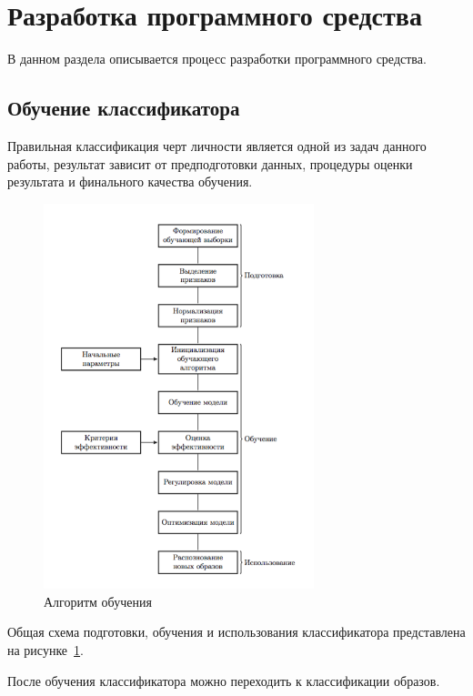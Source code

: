 \section{Разработка программного средства}
В данном раздела описывается процесс разработки программного \mbox{средства.}

\subsection{Обучение классификатора}
Правильная классификация черт личности является одной из задач данного работы, результат зависит от предподготовки данных, процедуры оценки результата и финального качества обучения.

\begin{figure}[h]
    \centering
    \includegraphics[width=0.7\textwidth]{figures/SVM_flow.png}
    \caption{Алгоритм обучения}
    \label{fig:develoipment:svm_flow}
\end{figure}

Общая схема подготовки, обучения и использования классификатора представлена на рисунке~\ref{fig:develoipment:svm_flow}.

После обучения классификатора можно переходить к классификации образов. 

